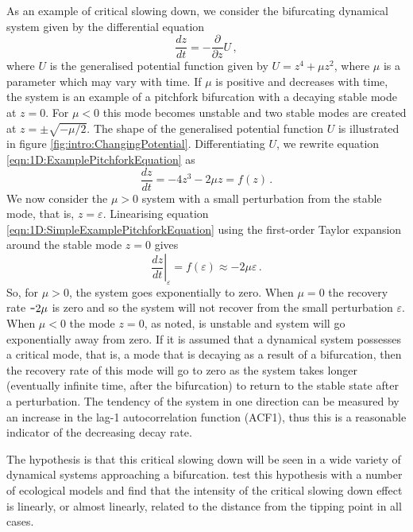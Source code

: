 {As an example of critical slowing down, we consider the bifurcating dynamical system given by the differential equation 
	\begin{equation}
		\frac{dz}{dt} = -\frac{\partial}{\partial z}U\,,
	\label{eqn:1D:ExamplePitchforkEquation}
	\end{equation}
where $U$ is the generalised potential function given by $U = z^4 + \mu z^2$, where $\mu$ is a parameter which may vary with time. If $\mu$ is positive and decreases with time, the system is an example of a pitchfork bifurcation with a decaying stable mode at $z=0$. For $\mu<0$ this mode becomes unstable and two stable modes are created at $z=\pm\sqrt{-\mu/2}$. The shape of the generalised potential function $U$ is illustrated in figure \ref{fig:intro:ChangingPotential}. Differentiating $U$, we rewrite equation \ref{eqn:1D:ExamplePitchforkEquation} as
	\begin{equation}
		\frac{dz}{dt} = -4z^3-2\mu z = f(z)\,.
	\label{eqn:1D:SimpleExamplePitchforkEquation}
	\end{equation}
We now consider the $\mu>0$ system with a small perturbation from the stable mode, that is, $z=\varepsilon$. Linearising  equation \ref{eqn:1D:SimpleExamplePitchforkEquation} using the first-order Taylor expansion around the stable mode $z=0$ gives
	\begin{equation}
		\left.\frac{dz}{dt}\right|_\varepsilon = f(\varepsilon) \approx -2\mu\varepsilon\,.
	\label{eqn:1D:TaylorExp}
	\end{equation}
So, for $\mu>0$, the system goes exponentially to zero. When $\mu=0$ the recovery rate $\textup{\texttt{-}}2\mu$ is zero and so the system will not recover from the small perturbation $\varepsilon$. When $\mu<0$ the mode $z=0$, as noted, is unstable and system will go exponentially away from zero. If it is assumed that a dynamical system possesses a critical mode, that is, a mode that is decaying as a result of a bifurcation, then the recovery rate of this mode will go to zero as the system takes longer (eventually infinite time, after the bifurcation) to return to the stable state after a perturbation. The tendency of the system in one direction can be measured by an increase in the lag-1 autocorrelation function (ACF1), thus this is a reasonable indicator of the decreasing decay rate. 

The hypothesis is that this critical slowing down will be seen in a wide variety of dynamical systems approaching a bifurcation. \citet{van2007} test this hypothesis with a number of ecological models and find that the intensity of the critical slowing down effect is linearly, or almost linearly, related to the distance from the tipping point in all cases.



}
